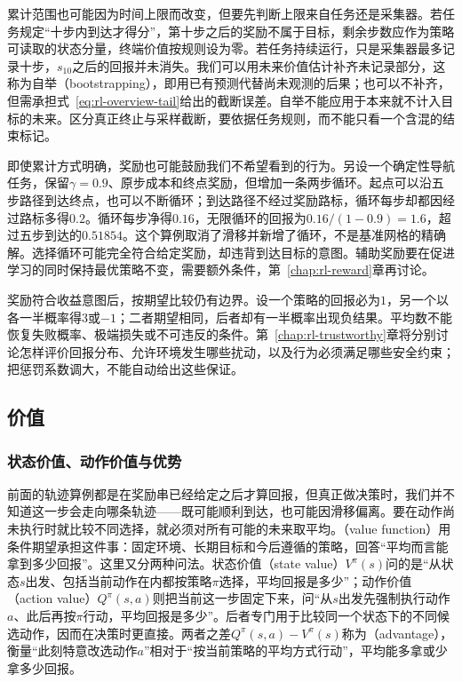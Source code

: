 累计范围也可能因为时间上限而改变，但要先判断上限来自任务还是采集器。若任务规定“十步内到达才得分”，第十步之后的奖励不属于目标，剩余步数应作为策略可读取的状态分量，终端价值按规则设为零。若任务持续运行，只是采集器最多记录十步，$s_{10}$之后的回报并未消失。我们可以用未来价值估计补齐未记录部分，这称为自举（bootstrapping），即用已有预测代替尚未观测的后果；也可以不补齐，但需承担式~\eqref{eq:rl-overview-tail}给出的截断误差。自举不能应用于本来就不计入目标的未来。区分真正终止与采样截断，要依据任务规则，而不能只看一个含混的结束标记。

即使累计方式明确，奖励也可能鼓励我们不希望看到的行为。另设一个确定性导航任务，保留$\gamma=0.9$、原步成本和终点奖励，但增加一条两步循环。起点可以沿五步路径到达终点，也可以不断循环；到达路径不经过奖励路标，循环每步却都因经过路标多得$0.2$。循环每步净得$0.16$，无限循环的回报为$0.16/(1-0.9)=1.6$，超过五步到达的$0.51854$。这个算例取消了滑移并新增了循环，不是基准网格的精确解。选择循环可能完全符合给定奖励，却违背到达目标的意图。辅助奖励要在促进学习的同时保持最优策略不变，需要额外条件，第~\ref{chap:rl-reward}章再讨论。

奖励符合收益意图后，按期望比较仍有边界。设一个策略的回报必为$1$，另一个以各一半概率得$3$或$-1$；二者期望相同，后者却有一半概率出现负结果。平均数不能恢复失败概率、极端损失或不可违反的条件。第~\ref{chap:rl-trustworthy}章将分别讨论怎样评价回报分布、允许环境发生哪些扰动，以及行为必须满足哪些安全约束；把惩罚系数调大，不能自动给出这些保证。

\subsection{价值}
\label{sec:rl-overview-values}

\subsubsection{状态价值、动作价值与优势}
\label{sec:rl-overview-value-functions}

前面的轨迹算例都是在奖励串已经给定之后才算回报，但真正做决策时，我们并不知道这一步会走向哪条轨迹——既可能顺利到达，也可能因滑移偏离。要在动作尚未执行时就比较不同选择，就必须对所有可能的未来取平均。（value function）用条件期望承担这件事：固定环境、长期目标和今后遵循的策略，回答“平均而言能拿到多少回报”。这里又分两种问法。状态价值（state value）$V^\pi(s)$问的是“从状态$s$出发、包括当前动作在内都按策略$\pi$选择，平均回报是多少”；动作价值（action value）$Q^\pi(s,a)$则把当前这一步固定下来，问“从$s$出发先强制执行动作$a$、此后再按$\pi$行动，平均回报是多少”。后者专门用于比较同一个状态下的不同候选动作，因而在决策时更直接。两者之差$Q^\pi(s,a)-V^\pi(s)$称为（advantage），衡量“此刻特意改选动作$a$”相对于“按当前策略的平均方式行动”，平均能多拿或少拿多少回报。

